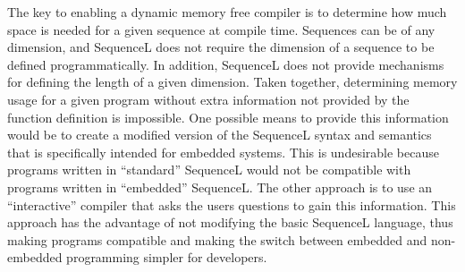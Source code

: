 The key to enabling a dynamic memory free compiler is to determine how much space is needed for a given sequence at compile time. Sequences can be of any dimension, and SequenceL does not require the dimension of a sequence to be defined programmatically. In addition, SequenceL does not provide mechanisms for defining the length of a given dimension. Taken together, determining memory usage for a given program without extra information not provided by the function definition is impossible. One possible means to provide this information would be to create a modified version of the SequenceL syntax and semantics that is specifically intended for embedded systems. This is undesirable because programs written in ``standard'' SequenceL would not be compatible with programs written in ``embedded'' SequenceL. The other approach is to use an ``interactive'' compiler that asks the users questions to gain this information. This approach has the advantage of not modifying the basic SequenceL language, thus making programs compatible and making the switch between embedded and non-embedded programming simpler for developers.

